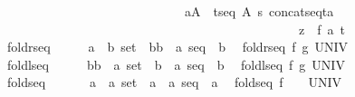 \begin{isabellebody}
\ \ \ \ \ \ \ \ \ \ \ \ \ \ \ \ \ \ \ \ \ \ \ \ \ \ \ \ \ {\isacharparenleft}{\isacharbang}\ a{\isacharcolon}A{\isachardot}\ {\isacharbang}\ t{\isacharcolon}seq\ A{\isachardot}\ s\ {\isacharequal}concatseq{\isacharpercent}{\isacharcircum}{\isacharparenleft}t{\isacharcomma}{\isacharpercent}{\isacharless}a{\isacharpercent}{\isachargreater}{\isacharparenright}{\isacharminus}{\isacharminus}{\isachargreater}\ \isanewline
\ \ \ \ \ \ \ \ \ \ \ \ \ \ \ \ \ \ \ \ \ \ \ \ \ \ \ \ \ \ \ \ \ \ \ \ \ \ \ \ \ \ \ \ \ \ \ \ z\ {\isacharequal}\ f\ a\ t{\isacharparenright}{\isachardoublequoteclose}\isanewline
\isanewline
\isanewline
\ \isanewline
\ \ foldrseq\ \ \ \ \ {\isacharcolon}{\isacharcolon}\ {\isachardoublequoteopen}{\isacharbrackleft}{\isacharparenleft}{\isacharparenleft}{\isacharprime}a\ {\isacharasterisk}\ {\isacharprime}b{\isacharparenright}\ set\ {\isacharless}{\isacharequal}{\isachargreater}\ {\isacharprime}b{\isacharparenright}{\isacharcomma}{\isacharprime}b{\isacharbrackright}\ {\isacharequal}{\isachargreater}\ {\isacharparenleft}{\isacharprime}a\ seq\ {\isacharless}{\isacharequal}{\isachargreater}\ {\isacharprime}b{\isacharparenright}{\isachardoublequoteclose}\isanewline
\ \ {\isachardoublequoteopen}foldrseq\ f\ g{\isacharequal}{\isacharequal}\ UNIV{\isachardoublequoteclose}\ \isanewline
\ \isanewline
\ \ foldlseq\ \ \ \ \ {\isacharcolon}{\isacharcolon}\ {\isachardoublequoteopen}{\isacharbrackleft}{\isacharprime}b{\isacharcomma}{\isacharparenleft}{\isacharparenleft}{\isacharprime}b\ {\isacharasterisk}\ {\isacharprime}a{\isacharparenright}\ set\ {\isacharless}{\isacharequal}{\isachargreater}\ {\isacharprime}b{\isacharparenright}{\isacharbrackright}\ {\isacharequal}{\isachargreater}\ {\isacharparenleft}{\isacharprime}a\ seq\ {\isacharless}{\isacharequal}{\isachargreater}\ {\isacharprime}b{\isacharparenright}{\isachardoublequoteclose}\isanewline
\ \ {\isachardoublequoteopen}foldlseq\ f\ g{\isacharequal}{\isacharequal}\ UNIV{\isachardoublequoteclose}\ \isanewline
\isanewline
\ \ foldseq\ \ \ \ \ \ {\isacharcolon}{\isacharcolon}\ {\isachardoublequoteopen}{\isacharbrackleft}{\isacharparenleft}{\isacharparenleft}{\isacharprime}a\ {\isacharasterisk}\ {\isacharprime}a{\isacharparenright}\ set\ {\isacharless}{\isacharequal}{\isachargreater}\ {\isacharprime}a{\isacharparenright}{\isacharbrackright}\ {\isacharequal}{\isachargreater}\ {\isacharparenleft}{\isacharprime}a\ seq\ {\isacharless}{\isacharequal}{\isachargreater}\ {\isacharprime}a{\isacharparenright}{\isachardoublequoteclose}\isanewline
\ \ {\isachardoublequoteopen}foldseq\ f\ \ \ {\isacharequal}{\isacharequal}\ UNIV{\isachardoublequoteclose}\ \isanewline

\end{isabellebody}
